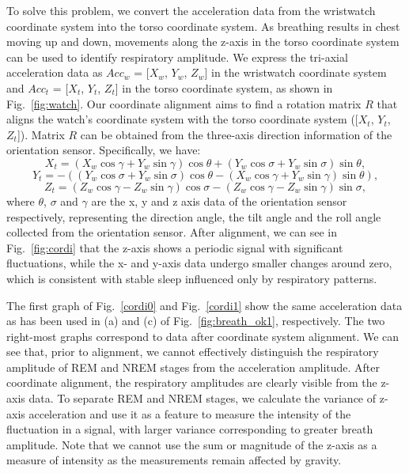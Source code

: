 To solve this problem, we convert the acceleration data from the wristwatch coordinate system into the torso coordinate system. {As breathing results in chest moving up and down, movements along the z-axis in the torso coordinate system can be used to identify respiratory amplitude}. We express the tri-axial acceleration data as $Acc_w$ = [$X_w$, $Y_w$, $Z_w$] in the wristwatch coordinate system and $Acc_t$ = [$X_t$, $Y_t$, $Z_t$] in the torso coordinate system, as shown in Fig.~\ref{fig:watch}.  {Our coordinate alignment aims to find a rotation matrix $R$ that aligns the watch's coordinate system with the torso coordinate system ({[$X_t$, $Y_t$, $Z_t$]}). Matrix $R$ can be obtained from the three-axis direction information of the orientation sensor. Specifically, we have:}
\begin{equation}
      X_t  = (X_w {\cos\gamma} + Y_w{\sin\gamma}){\cos\theta} + (Y_w\cos\sigma + Y_w\sin\sigma)\sin\theta,
\end{equation}
\begin{equation}
      Y_t = -((Y_w\cos\sigma + Y_w\sin\sigma)\cos\theta - (X_w\cos\gamma + Y_w\sin\gamma)\sin\theta),
\end{equation}
\begin{equation}
      Z_t = (Z_w\cos\gamma - Z_w\sin\gamma)\cos\sigma - (Z_w\cos\gamma - Z_w\sin\gamma)\sin\sigma,
\end{equation}
where $\theta$, $\sigma$ and $\gamma$ are the x, y and z axis data of the orientation sensor respectively, representing the direction angle, the tilt angle and the roll angle collected from the orientation sensor. After alignment, we can see in Fig.~\ref{fig:cordi} that the z-axis shows a periodic signal with significant fluctuations, {while the x- and y-axis data undergo smaller changes around zero, which is consistent with stable sleep influenced only by respiratory patterns.}

The first graph of Fig.~\ref{cordi0} and Fig.~\ref{cordi1} show the same acceleration data as has been used in (a) and (c) of Fig.~\ref{fig:breath_ok1}, respectively. The two right-most graphs correspond to data after coordinate system alignment.  We can see that, prior to alignment, we cannot effectively distinguish the respiratory amplitude of REM and NREM stages from the acceleration amplitude. After coordinate alignment, the respiratory amplitudes are clearly visible from the z-axis data. {To separate REM and NREM stages,} we calculate the variance of z-axis acceleration and use it as a feature to measure the intensity of the fluctuation in a signal, with larger variance corresponding to greater breath amplitude. Note that we cannot use the sum or magnitude of the z-axis as a measure of intensity as the measurements remain affected by gravity.

